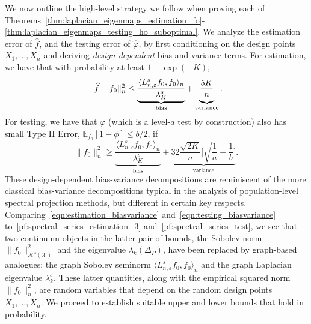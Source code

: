 \documentclass{article}
\newcommand{\1}{\mathbf{1}}
\newcommand{\mc}[1]{\mathcal{#1}}
\newcommand{\Ebb}{\mathbb{E}}
\newcommand{\dotp}[2]{\langle #1, #2 \rangle}
\newcommand{\wh}[1]{\widehat{#1}}
\theoremstyle{alden}
\theoremstyle{aldenthm}
\theoremstyle{definition}
\theoremstyle{remark}
\begin{document}
We now outline the high-level strategy we follow when proving each of Theorems~\ref{thm:laplacian_eigenmaps_estimation_fo}-\ref{thm:laplacian_eigenmaps_testing_ho_suboptimal}. We analyze the estimation error of $\wh{f}$, and the testing error of $\wh{\varphi}$, by first conditioning on the design points $X_1,\ldots,X_n$ and deriving \emph{design-dependent} bias and variance terms. For estimation, we have that with probability at least $1 - \exp(-K)$,
\begin{equation}
\label{eqn:estimation_biasvariance}
\|\wh{f} - f_0\|_n^2 \leq \underbrace{\frac{\dotp{L_{n,\varepsilon}^s f_0}{f_0}_n}{\lambda_{K}^s}}_{\textrm{bias}} + \underbrace{\frac{5K}{n} \vphantom{\frac{\dotp{L^s f_0}{f_0}_n}{\lambda_{K}^s}}}_{\textrm{variance}}.
\end{equation}
For testing, we have that $\varphi$ (which is a level-$a$ test by construction) also has small Type II Error, $\Ebb_{f_0}[1 - \phi] \leq b/2$, if 
\begin{equation}
\label{eqn:testing_biasvariance}
\|f_0\|_n^2 \geq  \underbrace{\frac{\dotp{L_{n,\varepsilon}^s f_0}{f_0}_n}{\lambda_{K}^s}}_{\textrm{bias}} + \underbrace{32\frac{\sqrt{2K}}{n}\biggl[\sqrt{\frac{1}{a}} + \frac{1}{b}\biggr]}_{\textrm{variance}}.
\end{equation}
These design-dependent bias-variance decompositions are reminiscent of the more classical bias-variance decompositions typical in the analysis of population-level spectral projection methods, but different in certain key respects. Comparing~\eqref{eqn:estimation_biasvariance} and~\eqref{eqn:testing_biasvariance} to~\eqref{pf:spectral_series_estimation_3} and~\eqref{pf:spectral_series_test}, we see that two continuum objects in the latter pair of bounds, the Sobolev norm $\|f_0\|_{\mc{H}^s(\mc{X})}^2$ and the eigenvalue $\lambda_k(\Delta_P)$, have been replaced by graph-based analogues: the graph Sobolev seminorm $\dotp{L_{n,\varepsilon}^sf_0}{f_0}_n$ and the graph Laplacian eigenvalue $\lambda_k^s$. These latter quantities, along with the empirical squared norm $\|f_0\|_n^2$, are random variables that depend on the random design points $X_1,\ldots,X_n$. We proceed to establish suitable upper and lower bounds that hold in probability. 
\end{document}
